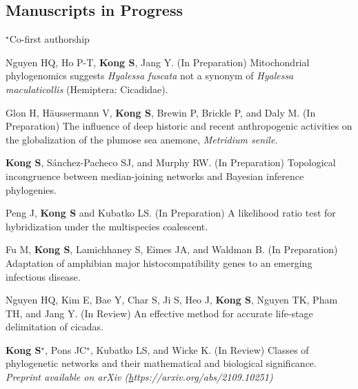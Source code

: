 \documentclass[11pt]{article}
\begin{document}
\subsection*{Manuscripts in Progress}
$^\star$Co-first authorship
\begin{etaremune}


	\item Nguyen HQ, Ho P-T, \textbf{Kong S}, Jang Y. (In Preparation) Mitochondrial phylogenomics suggests \textit{Hyalessa fuscata} not a synonym of \textit{Hyalessa maculaticollis} (Hemiptera: Cicadidae).

	\item Glon H, Häussermann V, \textbf{Kong S}, Brewin P, Brickle P, and Daly M. (In Preparation) The influence of deep historic and recent anthropogenic activities on the globalization of the plumose sea anemone, \textit{Metridium senile}.
	
	\item \textbf{Kong S}, Sánchez-Pacheco SJ, and Murphy RW. (In Preparation) Topological incongruence between median-joining networks and Bayesian inference phylogenies.
	
	\item Peng J, \textbf{Kong S} and Kubatko LS. (In Preparation) A likelihood ratio test for hybridization under the multispecies coalescent.
	
	\item Fu M, \textbf{Kong S}, Lamichhaney S, Eimes JA, and Waldman B. (In Preparation) Adaptation of amphibian major histocompatibility genes to an emerging infectious disease. 
	
	\item Nguyen HQ, Kim E, Bae Y, Char S, Ji S, Heo J, \textbf{Kong S}, Nguyen TK, Pham TH, and Jang Y. (In Review) An effective method for accurate life-stage delimitation of cicadas. %

	\item \textbf{Kong S}$^\star$, Pons JC$^\star$, Kubatko LS, and Wicke K. (In Review) Classes of phylogenetic networks and their mathematical and biological significance. \textit{Preprint available on arXiv (\href{https://arxiv.org/abs/2109.10251}https://arxiv.org/abs/2109.10251)}

	
\end{etaremune}
\end{document}
